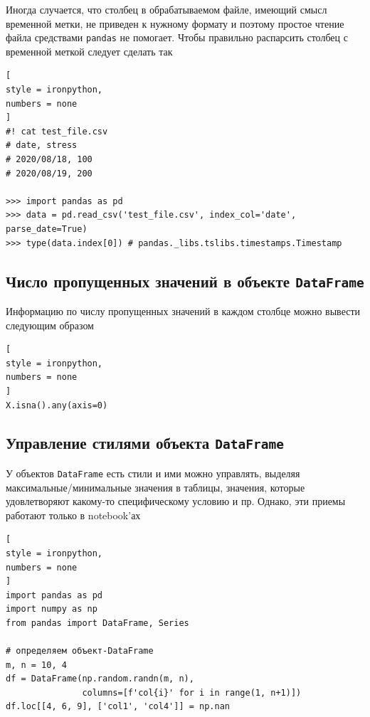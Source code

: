 \documentclass[%
	11pt,
	a4paper,
	utf8,
		]{article}
\begin{document}
Иногда случается, что столбец в обрабатываемом файле, имеющий смысл временной метки, не приведен к нужному формату и поэтому простое чтение файла средствами \texttt{pandas} не помогает. Чтобы правильно распарсить столбец с временной меткой следует сделать так
\begin{lstlisting}[
style = ironpython,
numbers = none
]
#! cat test_file.csv
# date, stress
# 2020/08/18, 100
# 2020/08/19, 200

>>> import pandas as pd
>>> data = pd.read_csv('test_file.csv', index_col='date', parse_date=True)
>>> type(data.index[0]) # pandas._libs.tslibs.timestamps.Timestamp
\end{lstlisting}

\subsection{Число пропущенных значений в объекте \texttt{DataFrame}}

Информацию по числу пропущенных значений в каждом столбце можно вывести следующим образом

\begin{lstlisting}[
style = ironpython,
numbers = none
]
X.isna().any(axis=0)
\end{lstlisting}

\subsection{Управление стилями объекта \texttt{DataFrame}}

У объектов \texttt{DataFrame} есть стили и ими можно управлять, выделяя максимальные/минимальные значения в таблицы, значения, которые удовлетворяют какому-то специфическому условию и пр. Однако, эти приемы работают только в notebook'ах

\begin{lstlisting}[
style = ironpython,
numbers = none
]
import pandas as pd
import numpy as np
from pandas import DataFrame, Series

# определяем объект-DataFrame
m, n = 10, 4
df = DataFrame(np.random.randn(m, n),
               columns=[f'col{i}' for i in range(1, n+1)])
df.loc[[4, 6, 9], ['col1', 'col4']] = np.nan
\end{lstlisting}
\end{document}
